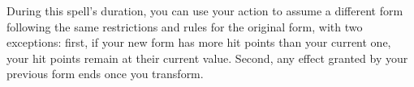 During this spell’s duration, you can use your action to assume a different form following the same restrictions and rules for the original form, with two exceptions: first, if your new form has more hit points than your current one, your hit points remain at their current value. Second, any effect granted by your previous form ends once you transform. 













